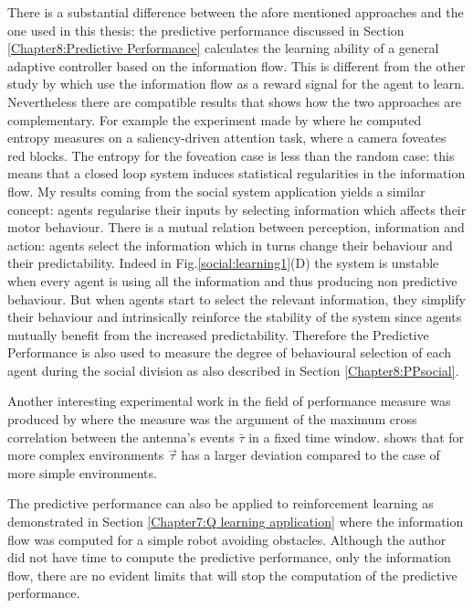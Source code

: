 There is a substantial difference between the afore mentioned approaches and the
one used in this thesis:
the predictive performance discussed in Section \ref{Chapter8:Predictive Performance}
calculates the learning ability of a general adaptive controller
 based on the information flow.
This is different from the other study by \citet{organizationInfo,LungarellaInformationStructure,AyClosedLoop} 
which use the information flow as a reward signal for the agent to learn.
Nevertheless there are compatible results that shows how the
two approaches are complementary.
For example the experiment made by \citet{LungarellaInformationStructure}
where he computed entropy measures on a saliency-driven attention
task, where a camera foveates red blocks. The entropy for the
foveation case is less than the random case:
this means that a closed loop system induces statistical regularities
in the information flow.
My results coming from the social system application yields
a similar concept: agents regularise their inputs
by selecting information which affects their motor behaviour.
There is a mutual relation between perception, information and action:
agents select the information which in turns change their
behaviour and their predictability.
Indeed in Fig.\ref{social:learning1}(D) the system is unstable
when every agent is using all the information and thus producing
non predictive behaviour. But when agents start to select the
relevant information, they simplify their behaviour and intrinsically reinforce
the stability of the system since agents mutually benefit from the increased predictability.
Therefore the Predictive Performance is also used to measure the degree of behavioural
selection of each agent during the social division as also described in Section \ref{Chapter8:PPsocial}.

Another interesting experimental work in the field of performance measure was produced 
by \citet{Kulvicius2009:analysisdifferential} where the measure was the argument of the maximum 
cross correlation between the antenna's events $\bar{\tau}$ in a fixed time window.
\citet{Kulvicius2009:analysisdifferential} shows that for more complex environments $\vec{\tau}$ has a larger
deviation compared to the case of more simple environments.

The predictive performance can also be applied to reinforcement learning \citep{TD}
as demonstrated in Section \ref{Chapter7:Q learning application} where
the information flow was computed for a simple robot avoiding obstacles.
Although the author did not have time to compute the predictive performance, 
only the information flow, there are no evident limits that will stop
the computation of the predictive performance.

